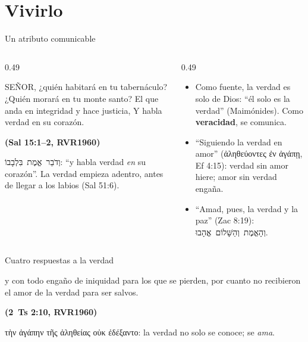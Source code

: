 \documentclass[hyperref={bookmarks=false},aspectratio=169]{beamer}
\newcommand{\heb}[1]{\mbox{\foreignlanguage{hebrew}{#1}}}
\newcommand{\grc}[1]{\foreignlanguage{ancientgreek}{#1}}
\newcommand{\SENOR}{S{\fontsize{0.78em}{1em}\selectfont EÑOR}}
\newcommand{\fuente}[1]{\par\hfill{\upshape\bfseries\footnotesize\textcolor{azul}{#1}}}
\newcommand{\destacar}[1]{\textbf{\textcolor{azul}{#1}}}
\begin{document}
\section{Vivirlo}

\begin{frame}{Un atributo comunicable}
\begin{columns}[t,onlytextwidth]
\begin{column}{0.49\textwidth}
\begin{cita}\SENOR{}, ¿quién habitará en tu tabernáculo? ¿Quién morará en tu monte santo? El que anda en integridad y hace justicia, Y habla verdad en su corazón.\fuente{(Sal 15:1--2, RVR1960)}\end{cita}
\scriptsize\heb{וְדֹבֵר אֱמֶת בִּלְבָבוֹ}: ``y habla verdad \emph{en} su corazón''. La verdad empieza adentro, antes de llegar a los labios (Sal 51:6).
\end{column}
\begin{column}{0.49\textwidth}\small
\begin{itemize}
\item Como fuente, la verdad es solo de Dios: ``él solo es la verdad'' (Maimónides). Como \destacar{veracidad}, se comunica.
\item ``Siguiendo la verdad en amor'' (\grc{ἀληθεύοντες ἐν ἀγάπῃ}, Ef 4:15): verdad sin amor hiere; amor sin verdad engaña.
\item ``Amad, pues, la verdad y la paz'' (Zac 8:19): \heb{וְהָאֱמֶת וְהַשָּׁלוֹם אֱהָבוּ}.
\end{itemize}
\end{column}
\end{columns}
\end{frame}

\begin{frame}{Cuatro respuestas a la verdad}
\centering
{}\par\medskip
\begin{cita}y con todo engaño de iniquidad para los que se pierden, por cuanto no recibieron el amor de la verdad para ser salvos.\fuente{(2~Ts 2:10, RVR1960)}\end{cita}
\scriptsize\grc{τὴν ἀγάπην τῆς ἀληθείας οὐκ ἐδέξαντο}: la verdad no solo se conoce; se \emph{ama}.
\end{frame}
\end{document}

